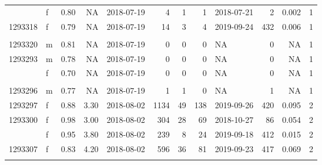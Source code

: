 \documentclass[
  number,
  review,
  3p]{elsarticle}
\begin{document}
\begin{table}[H]
\begin{tabular}{llrrlrrrlrrr}
\addlinespace
1293317 & f & 0.80 & NA & 2018-07-19 & 4 & 1 & 1 & 2018-07-21 & 2 & 0.002 & 1\\
1293318 & f & 0.79 & NA & 2018-07-19 & 14 & 3 & 4 & 2019-09-24 & 432 & 0.006 & 1\\
\cellcolor[HTML]{E2E2E2}{\textcolor{black}{1293319}} & \cellcolor[HTML]{E2E2E2}{\textcolor{black}{f}} & \cellcolor[HTML]{E2E2E2}{\textcolor{black}{0.73}} & \cellcolor[HTML]{E2E2E2}{\textcolor{black}{NA}} & \cellcolor[HTML]{E2E2E2}{\textcolor{black}{2018-07-19}} & \cellcolor[HTML]{E2E2E2}{\textcolor{black}{7}} & \cellcolor[HTML]{E2E2E2}{\textcolor{black}{1}} & \cellcolor[HTML]{E2E2E2}{\textcolor{black}{1}} & \cellcolor[HTML]{E2E2E2}{\textcolor{black}{2018-08-01}} & \cellcolor[HTML]{E2E2E2}{\textcolor{black}{19}} & \cellcolor[HTML]{E2E2E2}{\textcolor{black}{0.002}} & \cellcolor[HTML]{E2E2E2}{\textcolor{black}{1}}\\
1293320 & m & 0.81 & NA & 2018-07-19 & 0 & 0 & 0 & NA & 0 & NA & 1\\
1293293 & m & 0.78 & NA & 2018-07-19 & 0 & 0 & 0 & NA & 0 & NA & 1\\
\addlinespace
1293294 & f & 0.70 & NA & 2018-07-19 & 0 & 0 & 0 & NA & 0 & NA & 1\\
\cellcolor[HTML]{E2E2E2}{\textcolor{black}{1293295}} & \cellcolor[HTML]{E2E2E2}{\textcolor{black}{m}} & \cellcolor[HTML]{E2E2E2}{\textcolor{black}{0.78}} & \cellcolor[HTML]{E2E2E2}{\textcolor{black}{NA}} & \cellcolor[HTML]{E2E2E2}{\textcolor{black}{2018-07-19}} & \cellcolor[HTML]{E2E2E2}{\textcolor{black}{21}} & \cellcolor[HTML]{E2E2E2}{\textcolor{black}{2}} & \cellcolor[HTML]{E2E2E2}{\textcolor{black}{5}} & \cellcolor[HTML]{E2E2E2}{\textcolor{black}{2018-08-19}} & \cellcolor[HTML]{E2E2E2}{\textcolor{black}{31}} & \cellcolor[HTML]{E2E2E2}{\textcolor{black}{0.004}} & \cellcolor[HTML]{E2E2E2}{\textcolor{black}{1}}\\
1293296 & m & 0.77 & NA & 2018-07-19 & 1 & 1 & 0 & NA & 1 & NA & 1\\
1293297 & f & 0.88 & 3.30 & 2018-08-02 & 1134 & 49 & 138 & 2019-09-26 & 420 & 0.095 & 2\\
1293300 & f & 0.98 & 3.00 & 2018-08-02 & 304 & 28 & 69 & 2018-10-27 & 86 & 0.054 & 2\\
\addlinespace
1293298 & f & 0.95 & 3.80 & 2018-08-02 & 239 & 8 & 24 & 2019-09-18 & 412 & 0.015 & 2\\
1293307 & f & 0.83 & 4.20 & 2018-08-02 & 596 & 36 & 81 & 2019-09-23 & 417 & 0.069 & 2\\
\cellcolor[HTML]{E2E2E2}{\textcolor{black}{1293308}} & \cellcolor[HTML]{E2E2E2}{\textcolor{black}{f}} & \cellcolor[HTML]{E2E2E2}{\textcolor{black}{0.99}} & \cellcolor[HTML]{E2E2E2}{\textcolor{black}{3.70}} & \cellcolor[HTML]{E2E2E2}{\textcolor{black}{2018-08-02}} & \cellcolor[HTML]{E2E2E2}{\textcolor{black}{2067}} & \cellcolor[HTML]{E2E2E2}{\textcolor{black}{55}} & \cellcolor[HTML]{E2E2E2}{\textcolor{black}{257}} & \cellcolor[HTML]{E2E2E2}{\textcolor{black}{2019-10-05}} & \cellcolor[HTML]{E2E2E2}{\textcolor{black}{429}} & \cellcolor[HTML]{E2E2E2}{\textcolor{black}{0.106}} & \cellcolor[HTML]{E2E2E2}{\textcolor{black}{2}}\\

\end{tabular}
\end{table}
\end{document}
